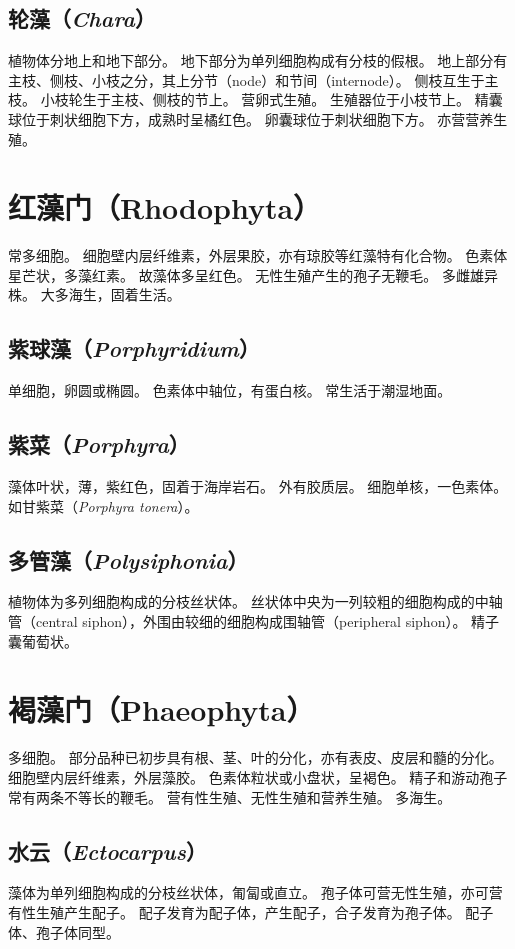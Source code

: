 \documentclass[11pt]{article}
\begin{document}
\subsection{轮藻（\textit{Chara}）}
植物体分地上和地下部分。
地下部分为单列细胞构成有分枝的假根。
地上部分有主枝、侧枝、小枝之分，其上分节（node）和节间（internode）。
侧枝互生于主枝。
小枝轮生于主枝、侧枝的节上。
营卵式生殖。
生殖器位于小枝节上。
精囊球位于刺状细胞下方，成熟时呈橘红色。
卵囊球位于刺状细胞下方。
亦营营养生殖。

\section{红藻门（Rhodophyta）}
常多细胞。
细胞壁内层纤维素，外层果胶，亦有琼胶等红藻特有化合物。
色素体星芒状，多藻红素。
故藻体多呈红色。
无性生殖产生的孢子无鞭毛。
多雌雄异株。
大多海生，固着生活。

\subsection{紫球藻（\textit{Porphyridium}）}
单细胞，卵圆或椭圆。
色素体中轴位，有蛋白核。
常生活于潮湿地面。

\subsection{紫菜（\textit{Porphyra}）}
藻体叶状，薄，紫红色，固着于海岸岩石。
外有胶质层。
细胞单核，一色素体。
如甘紫菜（\textit{Porphyra tonera}）。

\subsection{多管藻（\textit{Polysiphonia}）}
植物体为多列细胞构成的分枝丝状体。
丝状体中央为一列较粗的细胞构成的中轴管（central siphon），外围由较细的细胞构成围轴管（peripheral siphon）。
精子囊葡萄状。

\section{褐藻门（Phaeophyta）}
多细胞。
部分品种已初步具有根、茎、叶的分化，亦有表皮、皮层和髓的分化。
细胞壁内层纤维素，外层藻胶。
色素体粒状或小盘状，呈褐色。
精子和游动孢子常有两条不等长的鞭毛。
营有性生殖、无性生殖和营养生殖。
多海生。

\subsection{水云（\textit{Ectocarpus}）}
藻体为单列细胞构成的分枝丝状体，匍匐或直立。
孢子体可营无性生殖，亦可营有性生殖产生配子。
配子发育为配子体，产生配子，合子发育为孢子体。
配子体、孢子体同型。
\end{document}
